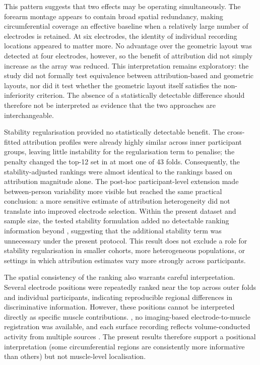 This pattern suggests that two effects may be operating simultaneously. The forearm montage appears to contain broad spatial redundancy, making circumferential coverage an effective baseline when a relatively large number of electrodes is retained. At six electrodes, the identity of individual recording locations appeared to matter more. No advantage over the geometric layout was detected at four electrodes, however, so the benefit of attribution did not simply increase as the array was reduced. This interpretation remains exploratory: the study did not formally test equivalence between attribution-based and geometric layouts, nor did it test whether the geometric layout itself satisfies the non-inferiority criterion. The absence of a statistically detectable difference should therefore not be interpreted as evidence that the two approaches are interchangeable.

Stability regularisation provided no statistically detectable benefit. The cross-fitted attribution profiles were already highly similar across inner participant groups, leaving little instability for the regularisation term to penalise; the penalty changed the top-12 set in at most one of 43 folds. Consequently, the stability-adjusted rankings were almost identical to the rankings based on attribution magnitude alone. The post-hoc participant-level extension made between-person variability more visible but reached the same practical conclusion: a more sensitive estimate of attribution heterogeneity did not translate into improved electrode selection. Within the present dataset and sample size, the tested stability formulation added no detectable ranking information beyond , suggesting that the additional stability term was unnecessary under the present protocol. This result does not exclude a role for stability regularisation \citep{xiang2026roshap} in smaller cohorts, more heterogeneous populations, or settings in which attribution estimates vary more strongly across participants.

The spatial consistency of the ranking also warrants careful interpretation. Several electrode positions were repeatedly ranked near the top across outer folds and individual participants, indicating reproducible regional differences in discriminative information. However, these positions cannot be interpreted directly as specific muscle contributions. , no imaging-based electrode-to-muscle registration was available, and each surface recording reflects volume-conducted activity from multiple sources \citep{farina2004extraction}. The present results therefore support a positional interpretation (some circumferential regions are consistently more informative than others) but not muscle-level localisation.


